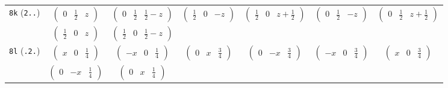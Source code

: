 \documentclass[fleqn,9pt,landscape]{jsarticle}
\begin{document}
\begin{center}
\begin{longtable}{ccccccc}
{\tt 8k} ({\tt 2..}) & $ \begin{pmatrix} 0 & \frac{1}{2} & z \end{pmatrix} $ & $ \begin{pmatrix} 0 & \frac{1}{2} & \frac{1}{2} - z \end{pmatrix} $ & $ \begin{pmatrix} \frac{1}{2} & 0 & - z \end{pmatrix} $ & $ \begin{pmatrix} \frac{1}{2} & 0 & z + \frac{1}{2} \end{pmatrix} $ & $ \begin{pmatrix} 0 & \frac{1}{2} & - z \end{pmatrix} $ & $ \begin{pmatrix} 0 & \frac{1}{2} & z + \frac{1}{2} \end{pmatrix} $ \\
& $ \begin{pmatrix} \frac{1}{2} & 0 & z \end{pmatrix} $ & $ \begin{pmatrix} \frac{1}{2} & 0 & \frac{1}{2} - z \end{pmatrix} $ & $  $ & $  $ & $  $ & $  $ \\ \hline
{\tt 8l} ({\tt .2.}) & $ \begin{pmatrix} x & 0 & \frac{1}{4} \end{pmatrix} $ & $ \begin{pmatrix} - x & 0 & \frac{1}{4} \end{pmatrix} $ & $ \begin{pmatrix} 0 & x & \frac{3}{4} \end{pmatrix} $ & $ \begin{pmatrix} 0 & - x & \frac{3}{4} \end{pmatrix} $ & $ \begin{pmatrix} - x & 0 & \frac{3}{4} \end{pmatrix} $ & $ \begin{pmatrix} x & 0 & \frac{3}{4} \end{pmatrix} $ \\
& $ \begin{pmatrix} 0 & - x & \frac{1}{4} \end{pmatrix} $ & $ \begin{pmatrix} 0 & x & \frac{1}{4} \end{pmatrix} $ & $  $ & $  $ & $  $ & $  $ \\ \hline

\end{longtable}
\end{center}
\end{document}
